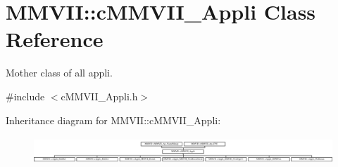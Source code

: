 \hypertarget{classMMVII_1_1cMMVII__Appli}{}\section{M\+M\+V\+II\+:\+:c\+M\+M\+V\+I\+I\+\_\+\+Appli Class Reference}
\label{classMMVII_1_1cMMVII__Appli}


Mother class of all appli.  




{\ttfamily \#include $<$c\+M\+M\+V\+I\+I\+\_\+\+Appli.\+h$>$}

Inheritance diagram for M\+M\+V\+II\+:\+:c\+M\+M\+V\+I\+I\+\_\+\+Appli\+:\begin{figure}[H]
\begin{center}
\leavevmode
\includegraphics[height=1.012658cm]{classMMVII_1_1cMMVII__Appli}
\end{center}
\end{figure}
